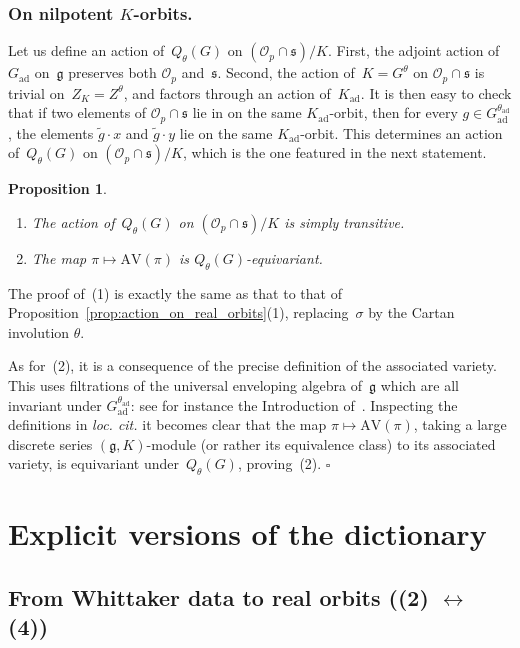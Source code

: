 \documentclass[10pt,leqno]{article}
\newtheorem{proposition}[equation]{Proposition}
\newcommand{\qed}{\hfill $\square$ \medskip}
\newcommand{\ad}{\mathrm{ad}}
\newcommand{\Gad}{G_\mathrm{ad}}
\newcommand{\Kad}{K_\mathrm{ad}}
\renewcommand{\O}{\mathcal O}
\newcommand{\g}{\mathfrak g}
\newcommand{\s}{\mathfrak s}
\newcommand{\AV}{\mathrm{AV}}
\newcommand{\Op}{\O_p}
\begin{document}
\subsubsection*{On nilpotent $K$-orbits.} 



Let us define an action of~$Q_{\theta}(G)$ on $(\Op \cap \s)/K$. First, the adjoint action of~$\Gad$ on~$\g$ preserves both $\Op$ and~$\s$. Second, the action of~$K=G^\theta$ on $\Op \cap \s$ is trivial on~$Z_K=Z^\theta$, and factors through an action of~$\Kad$. It is then easy to check that if two elements of $\Op \cap \s$ lie in on the same $\Kad$-orbit, then for every $g \in \Gad^{\theta_{\ad}}$, the elements  $\tilde{g} \cdot x$ and $\tilde{g} \cdot y$ lie on the same $\Kad$-orbit. This determines an action of~$Q_\theta(G)$ on $(\Op \cap \s)/K$, which is the one featured in the next statement.

\begin{proposition}\label{prop:action_on_K_orbits}
\begin{enumerate} 
\item The action of~$Q_{\theta}(G)$ on $(\Op \cap \s)/K$ is simply transitive.
\item The map $\pi \mapsto \AV(\pi)$ is $Q_{\theta}(G)$-equivariant.
\end{enumerate}
\end{proposition}

The proof of~(1) is exactly the same as that  to that of Proposition~\ref{prop:action_on_real_orbits}(1), replacing~$\sigma$ by the Cartan involution $\theta$.

As for~(2), it is a consequence of the precise definition of the associated variety. This uses filtrations of the universal enveloping algebra of~$\g$ which are all invariant under $\Gad^{\theta_{\ad}}$: see for instance the Introduction of~\cite{vogan_bowdoin}. Inspecting the definitions in \emph{loc. cit.} it becomes clear that the map $\pi \mapsto \AV(\pi)$, taking a large discrete series $(\g,K)$-module  (or rather its equivalence class) to its associated variety, is equivariant under~$Q_{\theta}(G)$, proving~(2). 
\qed


\section{Explicit versions of the dictionary}\label{sec:explicit}

\subsection{From Whittaker data to real orbits ((2) $\leftrightarrow$ (4))}
\end{document}
